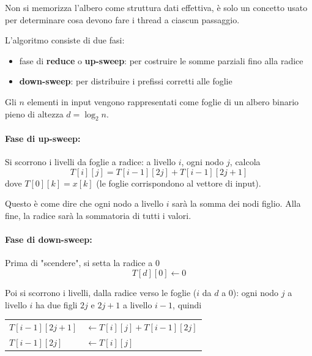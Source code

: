 Non si memorizza l'albero come struttura dati effettiva, è solo un concetto usato per determinare cosa devono fare i thread a ciascun passaggio. 

L'algoritmo consiste di due fasi:
\begin{itemize}
    \item fase di \textbf{reduce} o \textbf{up-sweep}: per costruire le somme parziali fino alla radice
    
    \item \textbf{down-sweep}: per distribuire i prefissi corretti alle foglie
\end{itemize}

Gli $n$ elementi in input vengono rappresentati come foglie di un albero binario pieno di altezza $d = \log_2 n$.

\paragraph{Fase di up-sweep:} Si scorrono i livelli da foglie a radice: a livello $i$, ogni nodo $j$, calcola
$$ T[i][j] = T[i-1][2j] + T[i-1][2j + 1] $$
dove $T[0][k] = x[k]$ (le foglie corrispondono al vettore di input). 

Questo è come dire che ogni nodo a livello $i$ sarà la somma dei nodi figlio. Alla fine, la radice sarà la sommatoria di tutti i valori.

%     

\paragraph{Fase di down-sweep:} Prima di "scendere", si setta la radice a $0$
$$ T[d][0] \leftarrow 0 $$

Poi si scorrono i livelli, dalla radice verso le foglie ($i$ da $d$ a $0$): ogni nodo $j$ a livello $i$ ha due figli $2j$ e $2j+1$ a livello $i-1$, quindi 
\begin{center}
    \begin{tabular}{l l}
        $T[i-1][2j + 1]$ & $\leftarrow T[i][j] + T[i-1][2j]$ \\
        $T[i-1][2j]$ & $\leftarrow T[i][j]$
    \end{tabular}
\end{center}

%     

